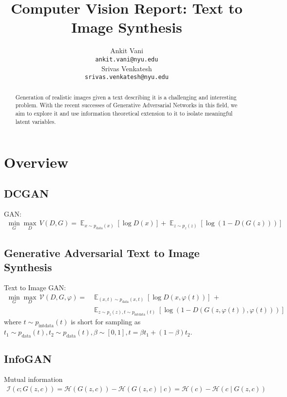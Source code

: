 \documentclass{article}
\title{Computer Vision Report: Text to Image Synthesis}
\author{
  Ankit Vani \\
  \texttt{ankit.vani@nyu.edu} \\
  \And
  Srivas Venkatesh \\
  \texttt{srivas.venkatesh@nyu.edu} \\
}
\DeclareMathOperator*{\E}{\mathbb{E}}
\begin{document}
\maketitle

\begin{abstract}
  Generation of realistic images given a text describing it is a challenging and interesting problem. With the recent successes of Generative Adversarial Networks in this field, we aim to explore it and use information theoretical extension to it to isolate meaningful latent variables.
\end{abstract}

\section{Overview}

\subsection{DCGAN}

GAN:
\begin{align}
\min_G \max_D\, V(D,G) = \E_{x \sim p_{\text{data}}(x)}\left[\log D(x)\right] + \E_{z\sim p_z(z)}\left[\log(1-D(G(z)))\right] \label{eq:gan}
\end{align}


\subsection{Generative Adversarial Text to Image Synthesis}



Text to Image GAN:
\begin{align}
\min_G \max_D\, \mathcal{V}(D,G, \varphi) =& \E_{(x,t) \sim p_{\text{data}}(x,t)}\left[\log D(x, \varphi(t))\right]\, + \nonumber\\
&\E_{z\sim p_z(z), t\sim p_{\text{intdata}}(t)}\left[\log(1-D(G(z, \varphi(t)), \varphi(t)))\right] \label{eq:t2i}
\end{align}
where $t \sim p_{\text{intdata}}(t)$ is short for sampling as $t_1 \sim p_{\text{data}}(t), t_2 \sim p_{\text{data}}(t), \beta \sim [0,1], t = \beta t_1 + (1-\beta) t_2$.


\subsection{InfoGAN}

Mutual information
\begin{align}
\mathcal{I}(c;G(z,c)) = \mathcal{H}(G(z,c)) - \mathcal{H}(G(z,c) \mid c) = \mathcal{H}(c) - \mathcal{H}(c\mid G(z,c))
\end{align}
\end{document}
